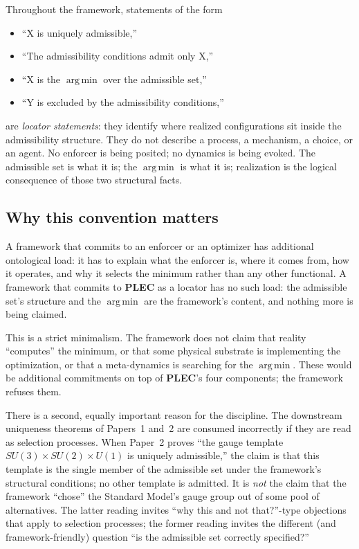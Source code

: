 \documentclass[11pt]{article}
\newcommand{\PLEC}{\textbf{PLEC}}
\newcommand{\argmin}{\mathop{\mathrm{arg\,min}}}
\begin{document}
\begin{tcolorbox}[apfbox, title={Descriptive Reading Convention}]
Throughout the framework, statements of the form
\begin{itemize}
    \item ``X is uniquely admissible,''
    \item ``The admissibility conditions admit only X,''
    \item ``X is the $\argmin$ over the admissible set,''
    \item ``Y is excluded by the admissibility conditions,''
\end{itemize}
are \emph{locator statements}: they identify where realized configurations sit inside the admissibility structure. They do not describe a process, a mechanism, a choice, or an agent. No enforcer is being posited; no dynamics is being evoked. The admissible set is what it is; the $\argmin$ is what it is; realization is the logical consequence of those two structural facts.
\end{tcolorbox}

\subsection{Why this convention matters}\label{sec:descriptive_why}

A framework that commits to an enforcer or an optimizer has additional ontological load: it has to explain what the enforcer is, where it comes from, how it operates, and why it selects the minimum rather than any other functional. A framework that commits to \PLEC{} as a locator has no such load: the admissible set's structure and the $\argmin$ are the framework's content, and nothing more is being claimed.

This is a strict minimalism. The framework does not claim that reality ``computes'' the minimum, or that some physical substrate is implementing the optimization, or that a meta-dynamics is searching for the $\argmin$. These would be additional commitments on top of \PLEC{}'s four components; the framework refuses them.

There is a second, equally important reason for the discipline. The downstream uniqueness theorems of Papers~1 and~2 are consumed incorrectly if they are read as selection processes. When Paper~2 proves ``the gauge template $SU(3)\times SU(2)\times U(1)$ is uniquely admissible,'' the claim is that this template is the single member of the admissible set under the framework's structural conditions; no other template is admitted. It is \emph{not} the claim that the framework ``chose'' the Standard Model's gauge group out of some pool of alternatives. The latter reading invites ``why this and not that?''-type objections that apply to selection processes; the former reading invites the different (and framework-friendly) question ``is the admissible set correctly specified?''
\end{document}
